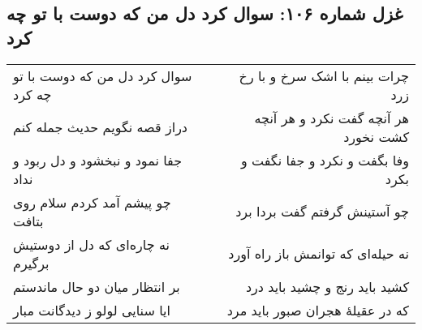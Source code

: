 \begin{center}
\section*{غزل شماره ۱۰۶: سوال کرد دل من که دوست با تو چه کرد}
\label{sec:106}
\begin{longtable}{l p{0.5cm} r}
سوال کرد دل من که دوست با تو چه کرد
&&
چرات بینم با اشک سرخ و با رخ زرد
\\
دراز قصه نگویم حدیث جمله کنم
&&
هر آنچه گفت نکرد و هر آنچه کشت نخورد
\\
جفا نمود و نبخشود و دل ربود و نداد
&&
وفا بگفت و نکرد و جفا نگفت و بکرد
\\
چو پیشم آمد کردم سلام روی بتافت
&&
چو آستینش گرفتم گفت بردا برد
\\
نه چاره‌ای که دل از دوستیش برگیرم
&&
نه حیله‌ای که توانمش باز راه آورد
\\
بر انتظار میان دو حال ماندستم
&&
کشید باید رنج و چشید باید درد
\\
ایا سنایی لولو ز دیدگانت مبار
&&
که در عقیلهٔ هجران صبور باید مرد
\\
\end{longtable}
\end{center}
